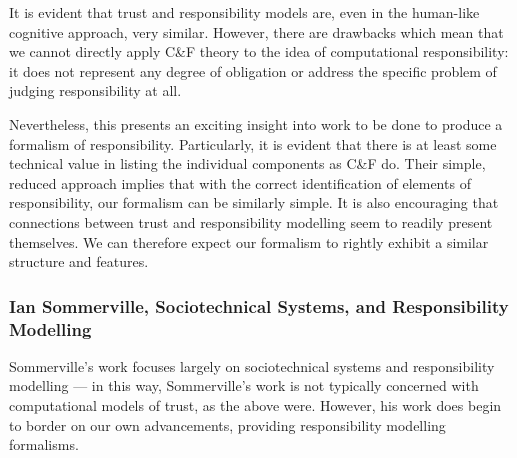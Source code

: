 It is evident that trust and responsibility models are, even in the human-like cognitive approach, very similar. However, there are drawbacks which mean that we cannot directly apply C\&F theory to the idea of computational responsibility: it does not represent any degree of obligation or address the specific problem of judging responsibility at all.\par

Nevertheless, this presents an exciting insight into work to be done to produce a formalism of responsibility. Particularly, it is evident that there is at least some technical value in listing the individual components as C\&F do. Their simple, reduced approach implies that with the correct identification of elements of responsibility, our formalism can be similarly simple. It is also encouraging that connections between trust and responsibility modelling seem to readily present themselves. We can therefore expect our formalism to rightly exhibit a similar structure and features.\par



\subsubsection{Ian Sommerville, Sociotechnical Systems, and Responsibility Modelling}
Sommerville's work focuses largely on sociotechnical systems and responsibility modelling --- in this way, Sommerville's work is not typically concerned with computational models of trust, as the above were. However, his work does begin to border on our own advancements, providing responsibility modelling formalisms.\par

